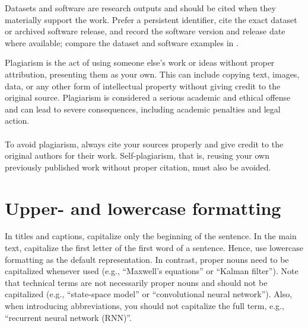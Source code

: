 Datasets and software are research outputs and should be cited when they materially support the work. Prefer a persistent identifier, cite the exact dataset or archived software release, and record the software version and release date where available; compare the dataset and software examples in \cite{Fisher1936Iris,Collins2026Latexmk}.
\begin{infobox}[title={Plagiarism}]
	Plagiarism is the act of using someone else's work or ideas without proper attribution, presenting them as your own. This can include copying text, images, data, or any other form of intellectual property without giving credit to the original source. Plagiarism is considered a serious academic and ethical offense and can lead to severe consequences, including academic penalties and legal action.\\
	\\
	To avoid plagiarism, always cite your sources properly and give credit to the original authors for their work. Self-plagiarism, that is, reusing your own previously published work without proper citation, must also be avoided.
\end{infobox}

\section{Upper- and lowercase formatting}
\label{sec:formatting}
In titles and captions, capitalize only the beginning of the sentence. In the main text, capitalize the first letter of the first word of a sentence. Hence, use lowercase formatting as the default representation. In contrast, proper nouns need to be capitalized whenever used (e.g., \enquote{Maxwell's equations} or \enquote{Kalman filter}). Note that technical terms are not necessarily proper nouns and should not be capitalized (e.g., \enquote{state-space model} or \enquote{convolutional neural network}). Also, when introducing abbreviations, you should not capitalize the full term, e.g., \enquote{recurrent neural network (RNN)}.


